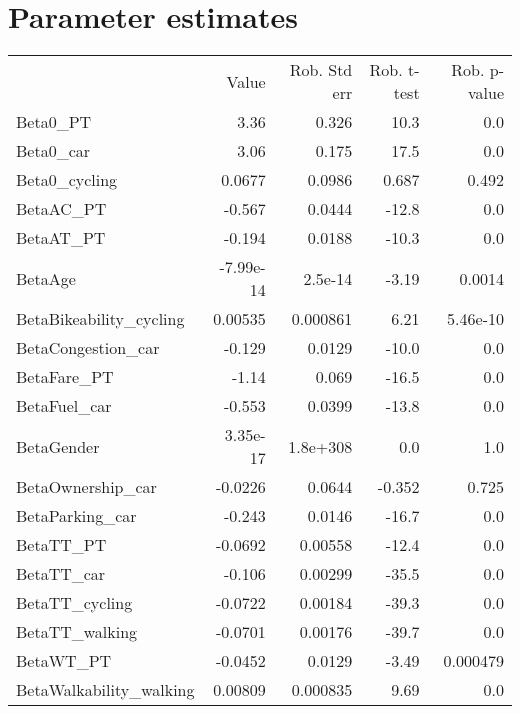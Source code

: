 \section{Parameter estimates}
\begin{tabular}{lrrrr}
 & Value & Rob. Std err & Rob. t-test & Rob. p-value \\
Beta0_PT & 3.36 & 0.326 & 10.3 & 0.0 \\
Beta0_car & 3.06 & 0.175 & 17.5 & 0.0 \\
Beta0_cycling & 0.0677 & 0.0986 & 0.687 & 0.492 \\
BetaAC_PT & -0.567 & 0.0444 & -12.8 & 0.0 \\
BetaAT_PT & -0.194 & 0.0188 & -10.3 & 0.0 \\
BetaAge & -7.99e-14 & 2.5e-14 & -3.19 & 0.0014 \\
BetaBikeability_cycling & 0.00535 & 0.000861 & 6.21 & 5.46e-10 \\
BetaCongestion_car & -0.129 & 0.0129 & -10.0 & 0.0 \\
BetaFare_PT & -1.14 & 0.069 & -16.5 & 0.0 \\
BetaFuel_car & -0.553 & 0.0399 & -13.8 & 0.0 \\
BetaGender & 3.35e-17 & 1.8e+308 & 0.0 & 1.0 \\
BetaOwnership_car & -0.0226 & 0.0644 & -0.352 & 0.725 \\
BetaParking_car & -0.243 & 0.0146 & -16.7 & 0.0 \\
BetaTT_PT & -0.0692 & 0.00558 & -12.4 & 0.0 \\
BetaTT_car & -0.106 & 0.00299 & -35.5 & 0.0 \\
BetaTT_cycling & -0.0722 & 0.00184 & -39.3 & 0.0 \\
BetaTT_walking & -0.0701 & 0.00176 & -39.7 & 0.0 \\
BetaWT_PT & -0.0452 & 0.0129 & -3.49 & 0.000479 \\
BetaWalkability_walking & 0.00809 & 0.000835 & 9.69 & 0.0 \\
\end{tabular}

